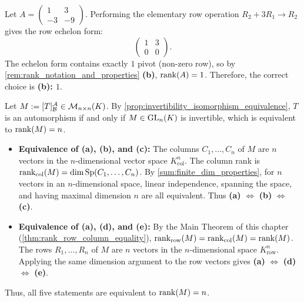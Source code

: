 \begin{exercisesolution*}
\label{sol:rank_2x2_matrix_sc}
Let $A = \left(\begin{smallmatrix} 1 & 3 \\ -3 & -9 \end{smallmatrix}\right)$.
Performing the elementary row operation $R_2 + 3R_1 \to R_2$ gives the row echelon form:
\[
\begin{pmatrix} 1 & 3 \\ 0 & 0 \end{pmatrix}.
\]
The echelon form contains exactly $1$ pivot (non-zero row), so by \cref{rem:rank_notation_and_properties} \textbf{(b)}, $\operatorname{rank}(A) = 1$.
Therefore, the correct choice is \textbf{(b): $1$}.
\end{exercisesolution*}

\begin{exercisesolution}
\label{sol:invertibility_characterizations_rep_matrix}
Let $M := [T]_{\mathcal{B}}^{\mathcal{A}} \in \mathcal{M}_{n \times n}(K)$.
By \cref{prop:invertibility_isomorphism_equivalence}, $T$ is an automorphism if and only if $M \in \operatorname{GL}_n(K)$ is invertible, which is equivalent to $\operatorname{rank}(M) = n$.

\begin{itemize}
    \item \textbf{Equivalence of (a), (b), and (c):}
    The columns $C_1, \dots, C_n$ of $M$ are $n$ vectors in the $n$-dimensional vector space $K_{\mathrm{col}}^n$.
    The column rank is $\operatorname{rank}_{\text{col}}(M) = \dim \operatorname{Sp}(C_1, \dots, C_n)$.
    By \cref{sum:finite_dim_properties}, for $n$ vectors in an $n$-dimensional space, linear independence, spanning the space, and having maximal dimension $n$ are all equivalent.
    Thus \textbf{(a)} $\iff$ \textbf{(b)} $\iff$ \textbf{(c)}.

    \item \textbf{Equivalence of (a), (d), and (e):}
    By the Main Theorem of this chapter (\cref{thm:rank_row_column_equality}), $\operatorname{rank}_{\text{row}}(M) = \operatorname{rank}_{\text{col}}(M) = \operatorname{rank}(M)$.
    The rows $R_1, \dots, R_n$ of $M$ are $n$ vectors in the $n$-dimensional space $K_{\mathrm{row}}^n$.
    Applying the same dimension argument to the row vectors gives \textbf{(a)} $\iff$ \textbf{(d)} $\iff$ \textbf{(e)}.
\end{itemize}
Thus, all five statements are equivalent to $\operatorname{rank}(M) = n$.
\end{exercisesolution}

